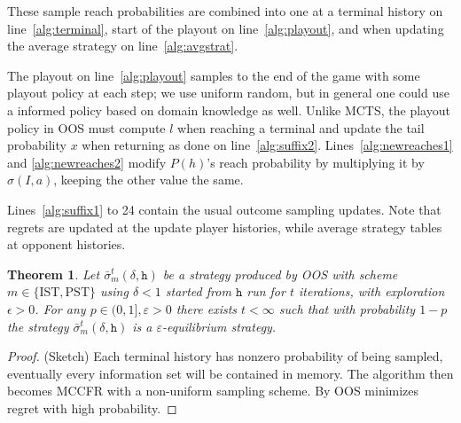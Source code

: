 \documentclass{aamas2015}
\newcounter{mlNoteCounter}
\newcommand{\mlnote}[1]{{\scriptsize \color{darkgreen} $\blacksquare$ \refstepcounter{mlNoteCounter}\textsf{[ML]$_{\arabic{mlNoteCounter}}$:{#1}}}}
\newcommand{\tth}{\mathtt{h}}
\newtheorem{theorem}{Theorem}
\begin{document}
These sample reach probabilities are combined into one at a terminal history on line~\ref{alg:terminal}, 
start of the playout on line~\ref{alg:playout}, and when updating the average 
strategy on line~\ref{alg:avgstrat}. 


The playout on line~\ref{alg:playout} samples to the end of the game with some playout policy at each step; we use uniform random, 
but in general one could use a informed policy based on domain knowledge as well. 
Unlike MCTS, the playout policy in OOS must compute $l$ when reaching a terminal and update the tail probability $x$ when returning
as done on line~\ref{alg:suffix2}. Lines~\ref{alg:newreaches1} and \ref{alg:newreaches2} modify $P(h)$'s reach probability 
by multiplying it by $\sigma(I,a)$, keeping the other value the same.

Lines~\ref{alg:suffix1} to 24
contain the usual outcome sampling updates. Note that regrets are updated at the 
update player histories, while average strategy tables at opponent histories. 

\begin{theorem}
Let $\bar{\sigma}^t_m(\delta,\tth)$ be a strategy produced by OOS with scheme $m \in \{ \mbox{IST}, \mbox{PST} \}$ 
using $\delta < 1$ started from $\tth$ run for $t$ iterations, with exploration $\epsilon > 0$.  
For any $p \in (0, 1], \varepsilon > 0$ there exists $t < \infty$ such that with 
probability $1-p$ the strategy  $\bar{\sigma}^t_m(\delta,\tth)$ is a $\varepsilon$-equilibrium strategy. 
\label{thm:consistency}
\end{theorem}
\begin{proof}(Sketch) Each terminal history has nonzero probability of being sampled, eventually every information 
set will be contained in memory. The algorithm then becomes MCCFR with a non-uniform sampling scheme.
By \cite[Theorem 5]{Lanctot09Sampling} OOS minimizes regret with high probability.
\end{proof}
\end{document}
